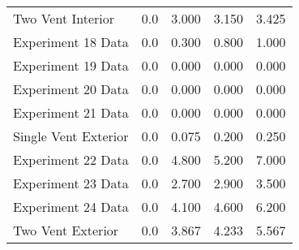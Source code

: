 \begin{tabular}{lrrrr}
Two Vent Interior    &       0.0 &            3.000 &            3.150 &      3.425 \\
Experiment 18 Data   &       0.0 &            0.300 &            0.800 &      1.000 \\
Experiment 19 Data   &       0.0 &            0.000 &            0.000 &      0.000 \\
Experiment 20 Data   &       0.0 &            0.000 &            0.000 &      0.000 \\
Experiment 21 Data   &       0.0 &            0.000 &            0.000 &      0.000 \\
Single Vent Exterior &       0.0 &            0.075 &            0.200 &      0.250 \\
Experiment 22 Data   &       0.0 &            4.800 &            5.200 &      7.000 \\
Experiment 23 Data   &       0.0 &            2.700 &            2.900 &      3.500 \\
Experiment 24 Data   &       0.0 &            4.100 &            4.600 &      6.200 \\
Two Vent Exterior    &       0.0 &            3.867 &            4.233 &      5.567 \\
\bottomrule
\end{tabular}
